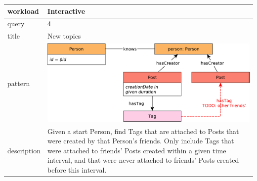 \renewcommand*{\arraystretch}{1.1}

\noindent\begin{tabularx}{17cm}{|p{1.95cm}|X|}
	\hline
	workload    & Interactive \\ \hline
%
	query       & 4 \\ \hline
%
	title       & New topics \\ \hline
%
    pattern     & \hfill\includegraphics[scale=\patternscale,margin=0cm .2cm]{patterns/interactive04}\hfill\vadjust{} \\ \hline
%
	description & Given a start Person, find Tags that are attached to Posts that were
created by that Person's friends. Only include Tags that were attached
to friends' Posts created within a given time interval, and that were
never attached to friends' Posts created before this interval.
 \\ \hline
	

\end{tabularx}
